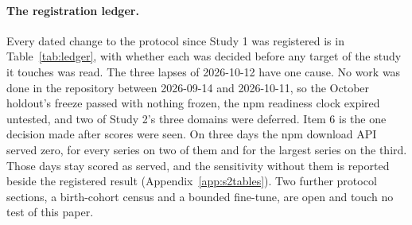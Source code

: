 \paragraph{The registration ledger.} Every dated change to the protocol since Study 1 was registered is in
Table~\ref{tab:ledger}, with whether each was decided before any target of the study it touches was read. The
three lapses of 2026-10-12 have one cause. No work was done in the repository between 2026-09-14 and
2026-10-11, so the October holdout's freeze passed with nothing frozen, the npm readiness clock expired
untested, and two of Study 2's three domains were deferred. Item 6 is the one decision made after scores were
seen. On three days the npm download API served zero, for every series on two of them and for the largest
series on the third. Those days stay scored as served, and the sensitivity without them is reported beside the
registered result (Appendix~\ref{app:s2tables}). Two further protocol sections, a birth-cohort census and a
bounded fine-tune, are open and touch no test of this paper.
